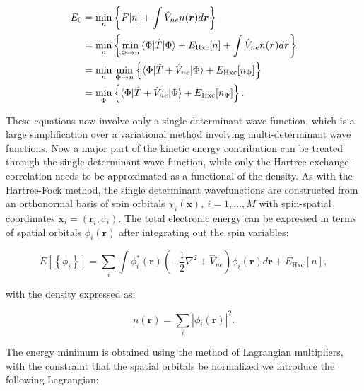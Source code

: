 \begin{equation}
    \begin{split}
        E_0
        &= \underset{n}{\min} \left\{
            F[n] + \int \hat{V}_{ne} n(\bm{r}) d\bm{r} \right\} \\
        &= \underset{n}{\min} \left\{
            \underset{\Phi \rightarrow n}{\min}
            \braket{\Phi | \hat{T} | \Phi}
            + E_{\text{Hxc}}[n] + \int \hat{V}_{ne} n(\bm{r}) d\bm{r} \right\} \\
        &= \underset{n}{\min} \ \underset{\Phi \rightarrow n}{\min}
        \left\{ \braket{\Phi | \hat{T} + \hat{V}_{ne} | \Phi}
        + E_{\text{Hxc}}[n_{\Phi}]
        \right\} \\
        &=  \underset{\Phi}{\min}
            \left\{ \braket{\Phi|\hat{T} + \hat{V}_{ne}|\Phi}
            + E_{\text{Hxc}}[n_{\Phi}]\right\}.
    \end{split}
\end{equation}

These equations now involve only a single-determinant wave function,
which is a large simplification over a variational method involving 
multi-determinant wave functions.
Now a major part of the kinetic energy contribution
can be treated through the single-determinant wave function,
while only the Hartree-exchange-correlation needs to be approximated
as a functional of the density.
As with the Hartree-Fock method, the single determinant
wavefunctions are constructed from an orthonormal basis of spin orbitals
$\chi_i (\bm{x}), \ i=1,\dots,M$ with spin-spatial
coordinates $\bm{x}_i = (\bm{r}_i, \sigma_i)$.
The total electronic energy can be expressed in terms of spatial
orbitals $\phi_i(\bm{r})$ after integrating out the spin variables:

\begin{equation}
    E[\left\{\phi_i\right\}] 
    = \sum_i \int \phi_i^* (\bm{r}) (-\frac{1}{2} \nabla^2 + \hat{V}_{ne})
        \phi_i(\bm{r}) d\bm{r} + E_{\text{Hxc}}[n] ,
\end{equation}

with the density expressed as:

\begin{equation}
    n(\bm{r}) = \sum_i \left| \phi_i(\bm{r}) \right|^2 .
\end{equation}

The energy minimum is obtained using the method of Lagrangian multipliers,
with the constraint that the spatial orbitals be normalized
we introduce the following Lagrangian:

